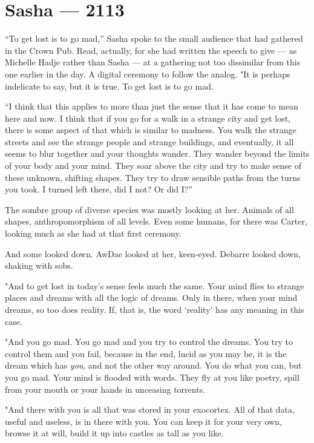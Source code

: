 \hypertarget{sasha-2113}{%
\chapter*{Sasha — 2113}\label{sasha-2113}}

``To get lost is to go mad,'' Sasha spoke to the small audience that had gathered in the Crown Pub. Read, actually, for she had written the speech to give — as Michelle Hadje rather than Sasha — at a gathering not too dissimilar from this one earlier in the day. A digital ceremony to follow the analog. "It is perhaps indelicate to say, but it is true. To get lost is to go mad.

``I think that this applies to more than just the sense that it has come to mean here and now. I think that if you go for a walk in a strange city and get lost, there is some aspect of that which is similar to madness. You walk the strange streets and see the strange people and strange buildings, and eventually, it all seems to blur together and your thoughts wander. They wander beyond the limits of your body and your mind. They soar above the city and try to make sense of these unknown, shifting shapes. They try to draw sensible paths from the turns you took. I turned left there, did I not? Or did I?''

The sombre group of diverse species was mostly looking at her. Animals of all shapes, anthropomorphism of all levels. Even some humans, for there was Carter, looking much as she had at that first ceremony.

And some looked down. AwDae looked at her, keen-eyed. Debarre looked down, shaking with sobs.

"And to get lost in today's sense feels much the same. Your mind flies to strange places and dreams with all the logic of dreams. Only in there, when your mind dreams, so too does reality. If, that is, the word `reality' has any meaning in this case.

"And you go mad. You go mad and you try to control the dreams. You try to control them and you fail, because in the end, lucid as you may be, it is the dream which has \emph{you}, and not the other way around. You do what you can, but you go mad. Your mind is flooded with words. They fly at you like poetry, spill from your mouth or your hands in unceasing torrents.

"And there with you is all that was stored in your exocortex. All of that data, useful and useless, is in there with you. You can keep it for your very own, browse it at will, build it up into castles as tall as you like.


